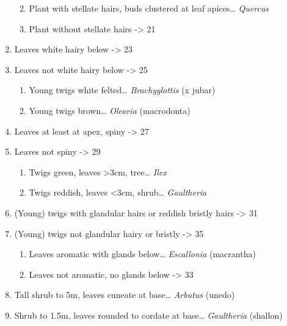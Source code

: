 \documentclass[openany]{book}
\providecommand{\tightlist}{%
  \setlength{\itemsep}{0pt}\setlength{\parskip}{0pt}}
\begin{document}
\begin{enumerate}
  \begin{enumerate}
  \def\labelenumii{\arabic{enumii}.}
  \setcounter{enumii}{18}
  \tightlist
  \item
    Plant with stellate hairs, buds clustered at leaf apices\ldots{}
    \emph{Quercus}
  \item
    Plant without stellate hairs -\textgreater{} 21
  \end{enumerate}
\item
  Leaves white hairy below -\textgreater{} 23
\item
  Leaves not white hairy below -\textgreater{} 25

  \begin{enumerate}
  \def\labelenumii{\arabic{enumii}.}
  \setcounter{enumii}{22}
  \tightlist
  \item
    Young twigs white felted\ldots{} \emph{Brachyglottis} (x jubar)
  \item
    Young twigs brown\ldots{} \emph{Olearia} (macrodonta)
  \end{enumerate}
\item
  Leaves at least at apex, spiny -\textgreater{} 27
\item
  Leaves not spiny -\textgreater{} 29

  \begin{enumerate}
  \def\labelenumii{\arabic{enumii}.}
  \setcounter{enumii}{26}
  \tightlist
  \item
    Twigs green, leaves \textgreater{}3cm, tree\ldots{} \emph{Ilex}
  \item
    Twigs reddish, leaves \textless{}3cm, shrub\ldots{}
    \emph{Gaultheria}
  \end{enumerate}
\item
  (Young) twigs with glandular hairs or reddish bristly hairs
  -\textgreater{} 31
\item
  (Young) twigs not glandular hairy or bristly -\textgreater{} 35

  \begin{enumerate}
  \def\labelenumii{\arabic{enumii}.}
  \setcounter{enumii}{30}
  \tightlist
  \item
    Leaves aromatic with glands below\ldots{} \emph{Escallonia}
    (macrantha)
  \item
    Leaves not aromatic, no glands below -\textgreater{} 33
  \end{enumerate}
\item
  Tall shrub to 5m, leaves cuneate at base\ldots{} \emph{Arbutus}
  (unedo)
\item
  Shrub to 1.5m, leaves rounded to cordate at base\ldots{}
  \emph{Gaultheria} (shallon)


\end{enumerate}
\end{document}
